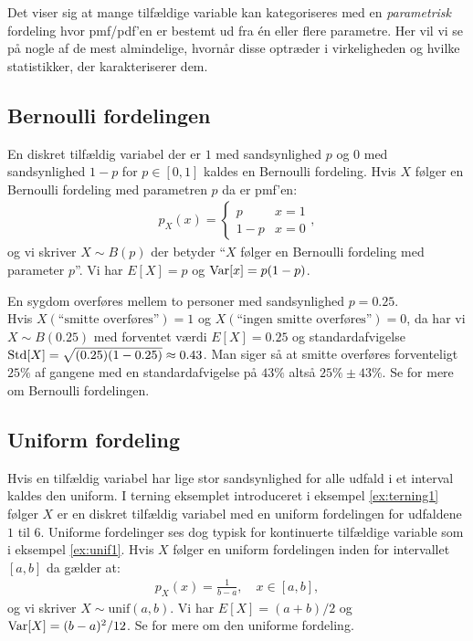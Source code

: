 Det viser sig at mange tilfældige variable kan kategoriseres med en \emph{parametrisk} fordeling hvor pmf/pdf'en er bestemt ud fra én eller flere parametre. Her vil vi se på nogle af de mest almindelige, hvornår disse optræder i virkeligheden og hvilke statistikker, der karakteriserer dem. 
\subsection{Bernoulli fordelingen}
En diskret tilfældig variabel der er $1$ med sandsynlighed $p$ og $0$ med sandsynlighed $1-p$ for $p \in [0,1]$ kaldes en Bernoulli fordeling. Hvis $X$ følger en Bernoulli fordeling med parametren $p$ da er pmf'en:
\begin{align*}
p_X(x) = \begin{cases} p & x = 1 \\
1 - p & x = 0 
\end{cases},
\end{align*} 
og vi skriver $X \sim B(p)$ der betyder ``$X$ følger en Bernoulli fordeling med parameter $p$''. Vi har $E[X] = p$ og $\operatorname{Var}[x] = p(1-p)$. 
\begin{example}
En sygdom overføres mellem to personer med sandsynlighed $p = 0.25$.  \\ 
Hvis  $X(\text{``smitte overføres''}) = 1$ og $X(\text{``ingen smitte overføres''}) = 0$, da har vi $X \sim B(0.25)$ med forventet værdi $E[X] = 0.25$ og standardafvigelse $\operatorname*{Std}[X] = \sqrt{(0.25)(1-0.25)} \approx 0.43$. Man siger så at smitte overføres forventeligt $25\%$ af gangene med en standardafvigelse på $43\%$ altså $25\% \pm 43\%$. Se \cite[111-112]{olofsson2012} for mere om Bernoulli fordelingen. 
\end{example}
\subsection{Uniform fordeling}
Hvis en tilfældig variabel har lige stor sandsynlighed for alle udfald i et interval kaldes den uniform. I terning eksemplet introduceret i eksempel \ref{ex:terning1} følger $X$ er en diskret tilfældig variabel med en uniform fordelingen for udfaldene $1$ til $6$. Uniforme fordelinger ses dog typisk for kontinuerte tilfældige variable som i eksempel \ref{ex:unif1}. Hvis $X$ følger en uniform fordelingen inden for intervallet $[a,b]$ da gælder at:
\begin{align*}
p_X(x) = \frac{1}{b-a}, \quad x \in [a,b],
\end{align*}
og vi skriver $X \sim \text{unif}(a,b)$. Vi har $E[X] = (a+b)/2$ og $\operatorname{Var}[X] = (b-a)^2/12$. Se \cite[90-92]{olofsson2012} for mere om den uniforme fordeling. 
